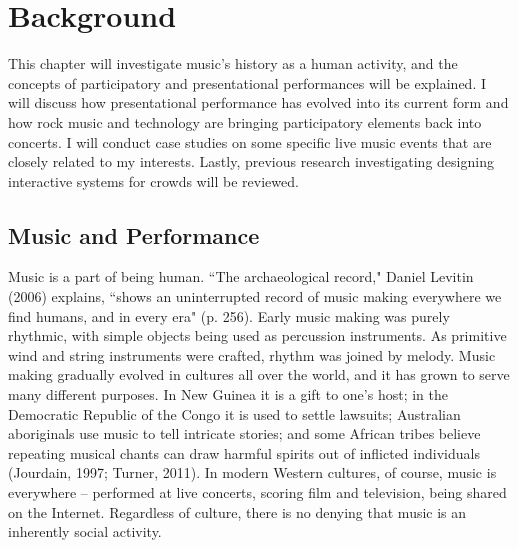 \chapter{Background}

This chapter will investigate music's history as a human activity, and the concepts of participatory and presentational performances will be explained. I will discuss how presentational performance has evolved into its current form and how rock music and technology are bringing participatory elements back into concerts. I will conduct case studies on some specific live music events that are closely related to my interests. Lastly, previous research investigating designing interactive systems for crowds will be reviewed.

\section{Music and Performance}

Music is a part of being human. ``The archaeological record," Daniel Levitin (2006) explains, ``shows an uninterrupted record of music making everywhere we find humans, and in every era" (p. 256). Early music making was purely rhythmic, with simple objects being used as percussion instruments. As primitive wind and string instruments were crafted, rhythm was joined by melody. Music making gradually evolved in cultures all over the world, and it has grown to serve many different purposes. In New Guinea it is a gift to one's host; in the Democratic Republic of the Congo it is used to settle lawsuits; Australian aboriginals use music to tell intricate stories; and some African tribes believe repeating musical chants can draw harmful spirits out of inflicted individuals (Jourdain, 1997; Turner, 2011). In modern Western cultures, of course, music is everywhere -- performed at live concerts, scoring film and television, being shared on the Internet. Regardless of culture, there is no denying that music is an inherently social activity.

